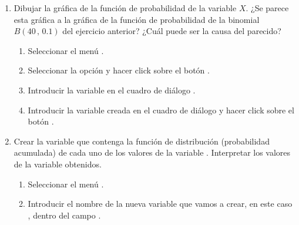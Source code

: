 \begin{enumerate}[leftmargin=*]
\begin{enumerate}
\begin{indicacion}
\begin{enumerate}
\end{enumerate}
\end{indicacion}



\item Dibujar la gráfica de la función de probabilidad de la
variable $X$. ¿Se parece esta gráfica a la gráfica de la función
de probabilidad de la binomial $B(40\,,\, 0.1)$ del ejercicio
anterior? ¿Cuál puede ser la causa del parecido?

\begin{indicacion}
\begin{enumerate}

\item Seleccionar el menú .


\item Seleccionar la opción  y hacer click sobre el
botón .

\item Introducir la variable  en el cuadro de diálogo
.

\item Introducir la variable creada  en el
cuadro de diálogo  y hacer click sobre el botón
.

\end{enumerate}
\end{indicacion}

\item  Crear la variable  que contenga la
función de distribución (probabilidad acumulada) de cada uno de
los valores de la variable . Interpretar los valores de
la variable obtenidos.

\begin{indicacion}
\begin{enumerate}
\item Seleccionar el menú .

\item Introducir el nombre de la nueva variable que vamos a crear,
en este caso , dentro del campo
.




\end{enumerate}
\end{indicacion}
\end{enumerate}
\end{enumerate}
